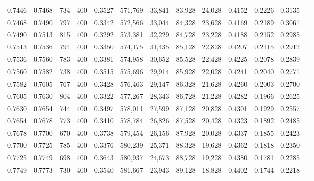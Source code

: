 \begin{tabular}{rrrrrrrrrrrrr}
0.7446 & 0.7468 &    734 & 400 &                                     0.3527 & 571,769 &  33,841 &  83,928 &  24,028 & 0.4152 & 0.2226 & 0.3135 \\
0.7468 & 0.7490 &    797 & 400 &                                     0.3342 & 572,566 &  33,044 &  84,328 &  23,628 & 0.4169 & 0.2189 & 0.3061 \\
0.7490 & 0.7513 &    815 & 400 &                                     0.3292 & 573,381 &  32,229 &  84,728 &  23,228 & 0.4188 & 0.2152 & 0.2985 \\
0.7513 & 0.7536 &    794 & 400 &                                     0.3350 & 574,175 &  31,435 &  85,128 &  22,828 & 0.4207 & 0.2115 & 0.2912 \\
0.7536 & 0.7560 &    783 & 400 &                                     0.3381 & 574,958 &  30,652 &  85,528 &  22,428 & 0.4225 & 0.2078 & 0.2839 \\
0.7560 & 0.7582 &    738 & 400 &                                     0.3515 & 575,696 &  29,914 &  85,928 &  22,028 & 0.4241 & 0.2040 & 0.2771 \\
0.7582 & 0.7605 &    767 & 400 &                                     0.3428 & 576,463 &  29,147 &  86,328 &  21,628 & 0.4260 & 0.2003 & 0.2700 \\
0.7605 & 0.7630 &    804 & 400 &                                     0.3322 & 577,267 &  28,343 &  86,728 &  21,228 & 0.4282 & 0.1966 & 0.2625 \\
0.7630 & 0.7654 &    744 & 400 &                                     0.3497 & 578,011 &  27,599 &  87,128 &  20,828 & 0.4301 & 0.1929 & 0.2557 \\
0.7654 & 0.7678 &    773 & 400 &                                     0.3410 & 578,784 &  26,826 &  87,528 &  20,428 & 0.4323 & 0.1892 & 0.2485 \\
0.7678 & 0.7700 &    670 & 400 &                                     0.3738 & 579,454 &  26,156 &  87,928 &  20,028 & 0.4337 & 0.1855 & 0.2423 \\
0.7700 & 0.7725 &    785 & 400 &                                     0.3376 & 580,239 &  25,371 &  88,328 &  19,628 & 0.4362 & 0.1818 & 0.2350 \\
0.7725 & 0.7749 &    698 & 400 &                                     0.3643 & 580,937 &  24,673 &  88,728 &  19,228 & 0.4380 & 0.1781 & 0.2285 \\
0.7749 & 0.7773 &    730 & 400 &                                     0.3540 & 581,667 &  23,943 &  89,128 &  18,828 & 0.4402 & 0.1744 & 0.2218 \\

\end{tabular}
